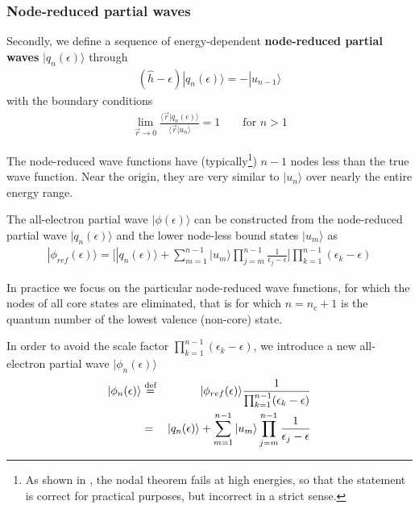 \documentclass[11pt,a4paper]{report}
\begin{document}
\subsubsection{Node-reduced partial waves}
Secondly, we define \cite{bloechl12_arxiv1210_5937} a sequence of
energy-dependent \textbf{node-reduced partial waves}
 $|q_n(\epsilon)\rangle$ through
\begin{eqnarray}
(\hat{h}-\epsilon)|q_n(\epsilon)\rangle=-|u_{n-1}\rangle
\label{eq:defnodereducedpartialwave}
\end{eqnarray}
with the boundary conditions
\begin{eqnarray}
\lim_{\vec{r}\rightarrow0}
\frac{\langle\vec{r}|q_n(\epsilon)\rangle}
{\langle\vec{r}|u_n\rangle}=1
\qquad\text{for $n>1$}
\end{eqnarray}

The node-reduced wave functions have (typically\footnote{As shown in
  \cite{bloechl12_arxiv1210_5937}, the nodal theorem fails at high
  energies, so that the statement is correct for practical purposes,
  but incorrect in a strict sense.}) $n-1$ nodes less than the true
wave function. Near the origin, they are very similar to $|u_n\rangle$
over nearly the entire energy range.

The all-electron partial wave $|\phi(\epsilon)\rangle$ can be
constructed from the node-reduced partial wave $|q_n(\epsilon)\rangle$
and the lower node-less bound states $|u_m\rangle$
as\cite{bloechl12_arxiv1210_5937}
\begin{eqnarray}
|\phi_{ref}(\epsilon)\rangle=\biggl[|q_n(\epsilon)\rangle
+\sum_{m=1}^{n-1}|u_m\rangle\prod_{j=m}^{n-1}\frac{1}{\epsilon_j-\epsilon}
\biggr]
\prod_{k=1}^{n-1}(\epsilon_k-\epsilon)
\label{eq:aephireffromnodereduced}
\end{eqnarray}

In practice we focus on the particular node-reduced wave functions,
for which the nodes of all core states are eliminated, that is for
which $n=n_c+1$ is the quantum number of the lowest valence (non-core)
state.

In order to avoid the scale factor
$\prod_{k=1}^{n-1}(\epsilon_k-\epsilon)$, we introduce a new
all-electron partial wave $|\phi_n(\epsilon)\rangle$
\begin{eqnarray}
|\phi_n(\epsilon)\rangle&\stackrel{\text{def}}{=}&
|\phi_{ref}(\epsilon)\rangle\frac{1}{\prod_{k=1}^{n-1}(\epsilon_k-\epsilon)}
\nonumber\\
&=&|q_n(\epsilon)\rangle
+\sum_{m=1}^{n-1}|u_m\rangle\prod_{j=m}^{n-1}\frac{1}{\epsilon_j-\epsilon}
\label{eq:aephifromnodereduced}
\end{eqnarray}
\end{document}
